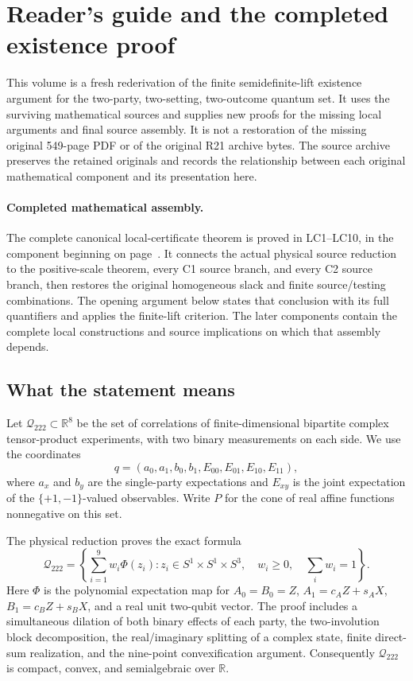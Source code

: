 \section*{Reader's guide and the completed existence proof}

This volume is a fresh rederivation of the finite semidefinite-lift
existence argument for the two-party, two-setting, two-outcome quantum
set.  It uses the surviving mathematical sources and supplies new proofs
for the missing local arguments and final source assembly.  It is not a restoration of the
missing original 549-page PDF or of the original R21 archive bytes.
The source archive preserves the retained originals and records the
relationship between each original mathematical component and its
presentation here.

\paragraph{Completed mathematical assembly.}
The complete canonical local-certificate theorem is proved in
LC1--LC10, in the component beginning on
page~\pageref{component:pe1088004af65}.  It connects the actual physical
source reduction to the positive-scale theorem, every C1 source branch,
and every C2 source branch, then restores the original homogeneous
slack and finite source/testing combinations.  The opening argument
below states that conclusion with its full quantifiers and applies the
finite-lift criterion.  The later components contain the complete local
constructions and source implications on which that assembly depends.

\subsection*{What the statement means}

Let $\mathcal Q_{222}\subset\mathbb R^8$ be the set of correlations
of finite-dimensional bipartite complex tensor-product experiments,
with two binary measurements on each side.  We use the coordinates
\[
 q=(a_0,a_1,b_0,b_1,E_{00},E_{01},E_{10},E_{11}),
\]
where $a_x$ and $b_y$ are the single-party expectations and $E_{xy}$
is the joint expectation of the $\{+1,-1\}$-valued observables.
Write $P$ for the cone of real affine functions nonnegative on this set.

The physical reduction proves the exact formula
\[
 \mathcal Q_{222}
 =\left\{\sum_{i=1}^{9}w_i\Phi(z_i):
     z_i\in S^1\times S^1\times S^3,
     \quad w_i\ge0,\quad\sum_iw_i=1\right\}.        \tag{FA1}
\]
Here $\Phi$ is the polynomial expectation map for
$A_0=B_0=Z$, $A_1=c_AZ+s_AX$, $B_1=c_BZ+s_BX$, and a real unit
two-qubit vector.  The proof includes a simultaneous dilation of both
binary effects of each party, the two-involution block decomposition,
the real/imaginary splitting of a complex state, finite direct-sum
realization, and the nine-point convexification argument.  Consequently
$\mathcal Q_{222}$ is compact, convex, and semialgebraic over $\mathbb R$.


